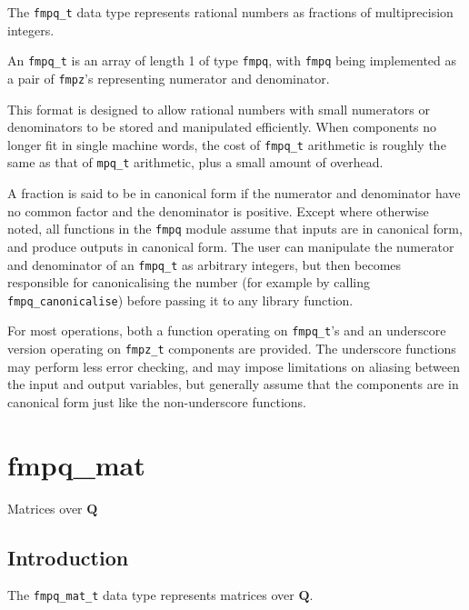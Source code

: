 \documentclass[a4paper,10pt]{book}
\newcommand{\Q}{\mathbf{Q}}%
\newcommand{\code}{\lstinline}
\begin{document}
{{The \code{fmpq_t} data type represents rational numbers
as fractions of multiprecision integers.

An \code{fmpq_t} is an array of length 1 of type \code{fmpq},
with \code{fmpq} being implemented as a pair of \code{fmpz}'s
representing numerator and denominator.

This format is designed to allow rational numbers with small
numerators or denominators to be stored and manipulated
efficiently. When components no longer fit in single
machine words, the cost of \code{fmpq_t} arithmetic
is roughly the same as that of \code{mpq_t} arithmetic,
plus a small amount of overhead.

A fraction is said to be in canonical form if the numerator
and denominator have no common factor and the denominator is
positive. Except where otherwise noted, all functions in the
\code{fmpq} module assume that
inputs are in canonical form, and produce outputs in canonical form.
The user can manipulate the numerator and denominator of an
\code{fmpq_t} as arbitrary integers, but then becomes
responsible for canonicalising the number (for example by calling
\code{fmpq_canonicalise}) before passing it to any library function.

For most operations, both a function operating
on \code{fmpq_t}'s and an underscore version operating
on \code{fmpz_t} components are provided. The underscore
functions may perform less error checking,
and may impose limitations on aliasing between the
input and output variables, but
generally assume that the components are in
canonical form just like the non-underscore functions.




\chapter{fmpq\_mat}
\epigraph{Matrices over $\Q$}{}

\section{Introduction}

The \code{fmpq_mat_t} data type represents matrices over $\Q$.

}}
\end{document}
